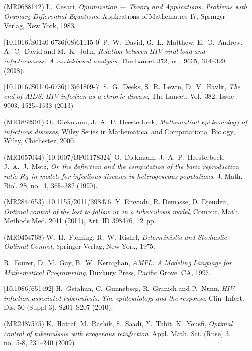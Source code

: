 \documentclass{my_aims}
\theoremstyle{definition}
\begin{document}
\begin{thebibliography}{99}
 (MR0688142)
\newblock L.~Cesari,
\newblock \emph{Optimization --- Theory and Applications.
Problems with Ordinary Differential Equations},
\newblock Applications of Mathematics 17, Springer-Verlag, New York, 1983.

 [10.1016/S0140-6736(08)61115-0]
\newblock P.~W.~David, G.~L.~Matthew, E.~G.~Andrew, A.~C.~David and M.~K.~John,
\newblock \emph{Relation between HIV viral load and infectiousness: A model-based analysis},
\newblock The Lancet 372, no.~9635, 314--320 (2008).

 [10.1016/S0140-6736(13)61809-7]
\newblock S.~G.~Deeks, S.~R.~Lewin, D.~V.~Havlir,
\newblock \emph{The end of AIDS: HIV infection as a chronic disease},
\newblock The Lancet, Vol.~382, Issue 9903, 1525--1533 (2013).

 (MR1882991)
\newblock O.~Diekmann, J.~A.~P.~Heesterbeek,
\newblock \emph{Mathematical epidemiology of infectious diseases},
\newblock Wiley Series in Mathematical and Computational Biology, Wiley, Chichester, 2000.

 (MR1057044) [10.1007/BF00178324]
\newblock O.~Diekmann, J.~A.~P.~Heesterbeek, J.~A.~J.~Metz,
\newblock \emph{On the definition and the computation of the basic reproduction ratio
$R\sb 0$ in models for infectious diseases in heterogeneous populations},
\newblock J. Math. Biol. 28, no.~4, 365--382 (1990).

 (MR2844653) [10.1155/2011/398476]
\newblock Y. Emvudu, R. Demasse, D. Djeudeu,
\newblock \emph{Optimal control of the lost to follow up in a tuberculosis model},
\newblock Comput. Math. Methods Med. 2011 (2011), Art. ID 398476, 12~pp.

 (MR0454768)
\newblock W.~H.~Fleming, R.~W.~Rishel,
\newblock \emph{Deterministic and Stochastic Optimal Control},
\newblock Springer Verlag, New York, 1975.

\newblock R.~Fourer, D.~M.~Gay, B.~W.~Kernighan,
\newblock \emph{AMPL: A Modeling Language for Mathematical Programming},
\newblock Duxbury Press, Pacific Grove, CA, 1993.

 [10.1086/651492]
\newblock H.~Getahun, C.~Gunneberg, R.~Granich and P.~Nunn,
\newblock \emph{HIV infection-associated tuberculosis: The epidemiology and the response},
\newblock Clin. Infect. Dis. 50 (Suppl 3), S201--S207 (2010).

 (MR2487575)
\newblock K.~Hattaf, M.~Rachik, S.~Saadi, Y.~Tabit, N.~Yousfi,
\newblock \emph{Optimal control of tuberculosis with exogenous reinfection},
\newblock Appl. Math. Sci. (Ruse) 3, no.~5-8, 231--240 (2009).


\end{thebibliography}
\end{document}
